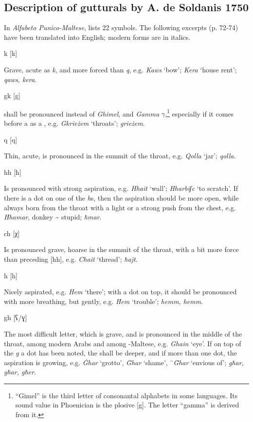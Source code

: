 \documentclass[output=paper]{langsci/langscibook}
\begin{document}
\subsection{Description of gutturals by A. de Soldanis 1750}

In \textit{Alfabeto Punico-Maltese}, \citet{AgiusdeSoldanis} lists 22 symbols. The following excerpts (p. 72-74) have been translated into English; modern  forms are in italics.

\ea
\parbox{1.5cm}{k  [k]}   Grave, acute as  \textit{k}, and more forced than \textit{q}, e.g. \textit{Kaws} ‘bow’; \textit{Kera} ‘house rent’; \textit{qaws, kera}.
\\\medskip
\parbox{1.5cm}{gk [g]}   shall be pronounced instead of  \textit{Ghimel}, and  \textit{Gamma} $\gamma $,\footnote{``Gimel'' is the third letter of consonantal alphabets in some  languages. Its sound value in Phoenician is the  plosive [g]. The  letter ``gamma''  is derived from it.} especially if it comes before a  as a , e.g. \textit{Gkrieżem} ‘throats’; \textit{grieżem}. 
\\\medskip
\parbox{1.5cm}{q  [q]}   Thin, acute, is pronounced in the summit of the throat, e.g. \textit{Qolla} ‘jar’; \textit{qolla}. 
\\\medskip
\parbox{1.5cm}{hh [ħ]}   Is pronounced with strong aspiration, e.g\textit{. Hhait} ‘wall’; \textit{Hharbiʃc} ‘to scratch’. If there is a dot on one of the \textit{h}s, then the aspiration should be more open, while always born from the throat with a light or a strong push from the chest, e.g. \textit{\.{H}hamar}, donkey {\textasciitilde} stupid; \textit{ħmar}. 
\\\medskip
\parbox{1.5cm}{ch [χ]}   Is pronounced grave, hoarse in the summit of the throat, with a bit more force than preceding [hh], e.g. \textit{Chait} ‘thread’; \textit{ħajt}. 
\\\medskip
\parbox{1.5cm}{h  [h]}   Nicely aspirated, e.g. \textit{Hem} ‘there’; with a dot on top, it should be pronounced with more breathing, but gently, e.g. \textit{\.{H}em} ‘trouble’; \textit{hemm, hemm}. 
\\\medskip
\parbox{1.5cm}{gh [ʕ/ɣ]} The most difficult letter, which is grave, and is pronounced in the middle of the throat, among modern Arabs and among -Maltese, e.g. \textit{Ghain} ‘eye’. If on top of the \textit{g} a dot has been noted, the  shall be deeper, and if more than one dot, the aspiration is growing, e.g. \textit{\.Ghar} ‘grotto’, \textit{\"{G}}\textit{har} ‘shame’, ¨\textit{\"{G}}\textit{har} ‘envious of’; \textit{għar, għar, għer}.  
\z
 
\end{document}
